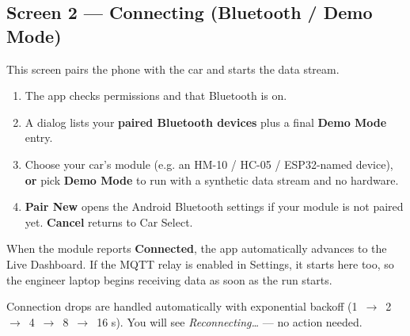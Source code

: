\documentclass[11pt,a4paper,oneside]{report}
\newcommand{\arrow}{\,$\rightarrow$\,}
\begin{document}
\subsection{Screen 2 --- Connecting (Bluetooth / Demo Mode)}
This screen pairs the phone with the car and starts the data stream.
\begin{enumerate}
  \item The app checks permissions and that Bluetooth is on.
  \item A dialog lists your \textbf{paired Bluetooth devices} plus a final
    \textbf{Demo Mode} entry.
  \item Choose your car's module (e.g. an HM-10 / HC-05 / ESP32-named device),
    \textbf{or} pick \textbf{Demo Mode} to run with a synthetic data stream and no
    hardware.
  \item \textbf{Pair New} opens the Android Bluetooth settings if your module is
    not paired yet. \textbf{Cancel} returns to Car Select.
\end{enumerate}
When the module reports \textbf{Connected}, the app automatically advances to the
Live Dashboard. If the MQTT relay is enabled in Settings, it starts here too, so
the engineer laptop begins receiving data as soon as the run starts.

\begin{tgnote}
Connection drops are handled automatically with exponential backoff
(1 \arrow{} 2 \arrow{} 4 \arrow{} 8 \arrow{} 16 s). You will see \emph{Reconnecting\ldots}
--- no action needed.
\end{tgnote}
\end{document}
